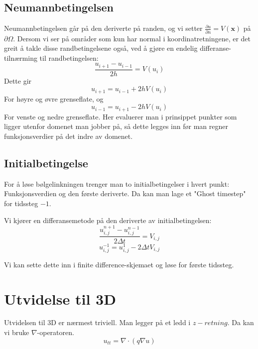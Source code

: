 \documentclass[a4paper, 10pt]{article}
\newcommand{\mb}{\mathbf}
\newcommand{\p}{\partial}
\begin{document}
\subsection{Neumannbetingelsen}
Neumannbetingelsen går på den deriverte på randen, og vi setter $\frac{\p u}{\p n} = V(\mb{x})$ på $\p\Omega$. Dersom vi ser på områder som kun har normal i koordinatretningene, er det greit å takle disse randbetingelsene også, ved å gjøre en endelig differanse-tilnærming til randbetingelsen:
\begin{equation}
	\frac{u_{i+1}-u_{i-1}}{2h} = V(u_i)
\end{equation}
Dette gir 
\begin{equation}
	u_{i+1} = u_{i-1} + 2hV(u_i)
\end{equation}
For høyre og øvre grenseflate, og 
\begin{equation}
	u_{i-1} = u_{i+1} - 2hV(u_i) 
\end{equation}
For venste og nedre grenseflate. 
Her evaluerer man i prinsippet punkter som ligger utenfor domenet man jobber på, så dette legges inn før man regner funksjonsverdier på det indre av domenet.

\subsection{Initialbetingelse}
For å løse bølgelinkningen trenger man to initialbetingelser i hvert punkt: Funksjonsverdien og den første deriverte. Da kan man lage et "Ghost timestep" for tidssteg $-1$. 

Vi kjører en differansemetode på den deriverte av initialbetingelsen:
\begin{equation}
	\frac{u_{i, j}^{n+1}-u_{i, j}^{n-1}}{2\Delta t} = V_{i, j}
\end{equation}
\begin{equation}
	u^{-1}_{i,j} = u^1_{i,j} - 2\Delta t V_{i,j}
\end{equation}

Vi kan sette dette inn i finite difference-skjemaet og løse for første tidssteg. 


\section{Utvidelse til 3D}
Utvidelsen til 3D er nærmest triviell. Man legger på et ledd i $z-retning$. Da kan vi bruke $\nabla$-operatoren.
\begin{equation}
	u_{tt} = \nabla\cdot(q\nabla u)
\end{equation}
\end{document}
